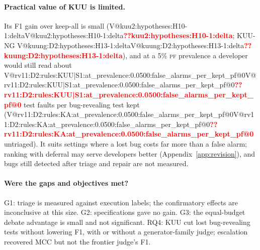 \documentclass[pdflatex,iicol,sn-mathphys-num]{sn-jnl}
\makeatletter
\newcommand{\V}[1]{\ifcsname V@#1\endcsname\csname V@#1\endcsname\else\textbf{\textcolor{red}{??#1}}\fi}
\newcommand{\PF}{\textsc{pf}}
\makeatother
\begin{document}
\paragraph{Practical value of KUU is limited.} Its F1 gain over keep-all is small (\V{kuu2:hypotheses:H10-1:delta}; KUU-NG \V{kuung:D2:hypotheses:H13-1:delta}), and at a 5\% \PF{} prevalence a developer would still read about \V{rv11:D2:rules:KUU|S1:at_prevalence:0.0500:false_alarms_per_kept_pf@0} test faults per bug-revealing test kept (\V{rv11:D2:rules:KA:at_prevalence:0.0500:false_alarms_per_kept_pf@0} untriaged). It suits settings where a lost bug costs far more than a false alarm; ranking with deferral may serve developers better (Appendix~\ref{app:revision}), and bugs still detected after triage and repair are not measured.








\paragraph{Were the gaps and objectives met?} G1: triage is measured against execution labels; the confirmatory effects are inconclusive at this size. G2: specifications gave no gain. G3: the equal-budget debate advantage is small and not significant. RQ4: KUU cut lost bug-revealing tests without lowering F1, with or without a generator-family judge; escalation recovered MCC but not the frontier judge's F1.
\end{document}
